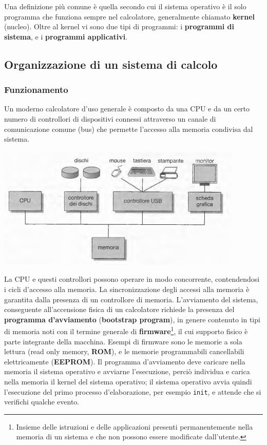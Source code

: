 \documentclass[11pt,a4paper]{article}
\begin{document}
Una definizione più comune è quella secondo cui il si­stema operativo è il solo programma che funziona sempre nel calcolatore, generalmente chia­mato \textbf{kernel} (nucleo). Oltre al kernel vi sono due tipi di programmi: i \textbf{programmi di sistema}, e i \textbf{programmi applicativi}.

\subsection{Organizzazione di un sistema di calcolo}
\subsubsection{Funzionamento}
Un moderno calcolatore d'uso generale è composto da una CPU e da un certo numero di
controllori di dispositivi connessi attraverso un canale di comunicazione comune (bus) che
permette l'accesso alla memoria condivisa dal sistema.
\begin{center}
  \includegraphics[scale=0.75]{img/0001.png}
\end{center}
La CPU e questi controllori possono operare in modo concor­rente, contendendosi i cicli d'accesso alla memoria. La sincronizzazione degli accessi alla
memoria è garantita dalla presenza di un controllore di memoria.
L'avviamento del sistema, conseguente all'accensione fisica di un calcolatore
richiede la presenza del \textbf{programma d'avviamento} (\textbf{bootstrap pro­gram}), in genere contenuto in tipi di memoria noti con il termine generale di \textbf{firmware}\footnote{Insieme delle istruzioni e delle applicazioni presenti permanentemente nella memoria di un sistema e che non possono essere modificate dall'utente.}, il
cui supporto fisico è parte integrante della macchina. Esempi di firmware sono le memorie
a sola lettura (read only memory, \textbf{ROM}), e le memorie programmabili cancellabili elettrica­mente (\textbf{EEPROM}). Il programma d'avviamento deve caricare nella memoria il siste­ma operativo e avviarne l'esecuzione, perciò individua e carica nella memoria il kernel del
sistema operativo; il sistema operativo avvia quindi l'esecuzione del primo processo d'elabo­razione, per esempio \texttt{init}, e attende che si verifichi qualche evento.
\end{document}
